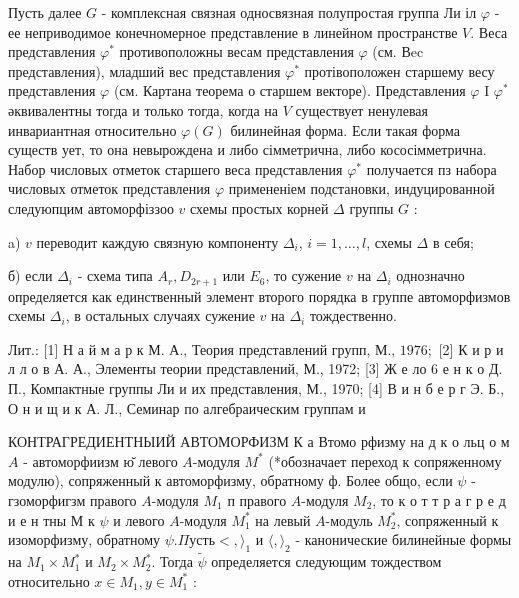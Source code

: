 \documentclass[10pt]{article}
\begin{document}
Пусть далее $G$ - комплексная связная односвязная полупростая группа Ли іл $\varphi$ - ее неприводимое конечномерное представление в линейном пространстве $V$. Веса представления $\varphi^{*}$ противоположны весам представления $\varphi$ (см. Вec представления), младший вес представления $\varphi^{*}$ протівоположен старшему весу представления $\varphi$ (см. Картана теорема о старшем векторе). Представления $\varphi$ I $\varphi^{*}$ әквивалентны тогда и только тогда, когда на $V$ существует ненулевая инвариантная относительно $\varphi(G)$ билинейная форма. Если такая форма существ ует, то она невырождена и либо сімметрична, либо кососімметрична. Набор числовых отметок старшего веса представления $\varphi^{*}$ получается пз набора числовых отметок представления $\varphi$ примененіем подстановки, индуцированной следуюпцим автоморфіззоо $v$ схемы простых корней $\Delta$ группы $G$ :



a) $v$ переводит каждую связную компоненту $\Delta_{i}$, $i=1, \ldots, l$, схемы $\Delta$ в себя;



б) если $\Delta_{i}$ - схема типа $A_{r}, D_{2 r+1}$ или $E_{6}$, то сужение $v$ на $\Delta_{i}$ однозначно определяется как единственный элемент второго порядка в группе автоморфизмов схемы $\Delta_{i}$, в остальных случаях сужение $v$ на $\Delta_{i}$ тождественно.



Лит.: [1] Н а й м а р к М. А., Теория представлений групп, М., $1976 ;$ [2] К и р и л л о в А. А., Элементы теории представлений, М., 1972; [3] Ж е ло 6 е н к о Д. П., Компактные группы Ли и их представления, М., 1970; [4] В и н б е р г Э. Б., О н и щ и к А. Л., Семинар по алгебраическим группам и



КОНТРАГРЕДИЕНТНЫИЙ АВТОМОРФИЗМ К а Втомо рфизму на д к о льц о м $A$ - автоморфиизм ю̆ левого $A$-модуля $M^{*}$ (*обозначает переход к сопряженному модулю), сопряженный к автоморфизму, обратному ф. Более общо, если $\psi$ - гзоморфигзм правого $A$-модуля $M_{1}$ п правого $A$-модуля $M_{2}$, то к о т т р а г р е д и е н тны М к $\psi$ и левого $A$-модуля $M_{1}^{*}$ на левый $A$-модуль $M_{2}^{*}$, сопряженный к изоморфизму, обратному $\psi . \Pi у с т ь<,\rangle_{1}$ и $\langle,\rangle_{2}$ - канонические билинейные формы на $M_{1} \times M_{1}^{*}$ и $M_{2} \times M_{2}^{*}$. Тогда $\tilde{\psi}$ определяется следующим тождеством относительно $x \in M_{1}, y \in M_{1}^{*}$ :
\end{document}
